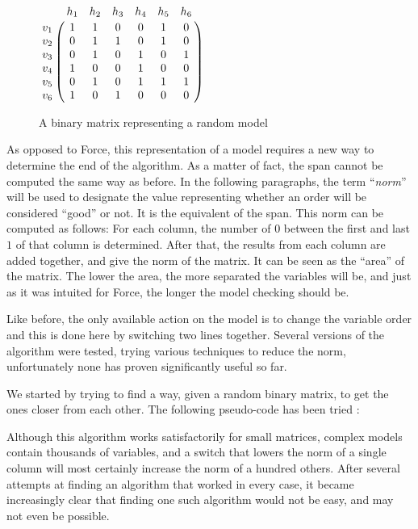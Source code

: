 \documentclass[12pt]{report}
\begin{document}
\begin{figure}[!h]
  \centering
  $\bordermatrix{
  ~ & h_1 & h_2 & h_3 & h_4 & h_5 & h_6 \cr
  v_1 & 1 & 1 & 0 & 0 & 1 & 0 \cr
  v_2 & 0 & 1 & 1 & 0 & 1 & 0 \cr
  v_3 & 0 & 1 & 0 & 1 & 0 & 1 \cr
  v_4 & 1 & 0 & 0 & 1 & 0 & 0 \cr
  v_5 & 0 & 1 & 0 & 1 & 1 & 1 \cr
  v_6 & 1 & 0 & 1 & 0 & 0 & 0\cr
  }$
  \caption{A binary matrix representing a random model}
  \label{example_matrix}
\end{figure}

As opposed to Force, this representation of a model requires a new way to determine the end of the algorithm. As a matter of fact, the span cannot be computed the same way as before. In the following paragraphs, the term \enquote{\it{norm}} will be used to designate the value representing whether an order will be considered \enquote{good} or not. It is the equivalent of the span. 
This norm can be computed as follows:
For each column, the number of $0$ between the first and last $1$ of that column is determined. After that, the results from each column are added together, and give the norm of the matrix. It can be seen as the \enquote{area} of the matrix. The lower the area, the more separated the variables will be, and just as it was intuited for Force, the longer the model checking should be.

Like before, the only available action on the model is to change the variable order and this is done here by switching two lines together. Several versions of the algorithm were tested, trying various techniques to reduce the norm, unfortunately none has proven significantly useful so far. 

We started by trying to find a way, given a random binary matrix, to get the ones closer from each other. The following pseudo-code has been tried :

\begin{algorithm}
\begin{algorithmic}[1]
    \EndIf
  \EndWhile
\EndFunction
\end{algorithmic}
\end{algorithm}

Although this algorithm works satisfactorily for small matrices, complex models contain thousands of variables, and a switch that lowers the norm of a single column will most certainly increase the norm of a hundred others.
After several attempts at finding an algorithm that worked in every case, it became increasingly clear that finding one such algorithm would not be easy, and may not even be possible.
\end{document}
